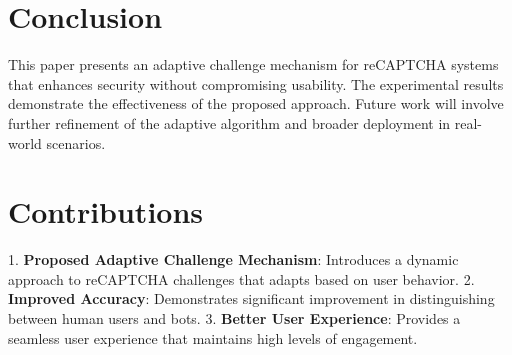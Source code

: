 \documentclass{article}
\begin{document}
\section{Conclusion}
This paper presents an adaptive challenge mechanism for reCAPTCHA systems that enhances security without compromising usability. The experimental results demonstrate the effectiveness of the proposed approach. Future work will involve further refinement of the adaptive algorithm and broader deployment in real-world scenarios.

\section{Contributions}
1. \textbf{Proposed Adaptive Challenge Mechanism}: Introduces a dynamic approach to reCAPTCHA challenges that adapts based on user behavior.
2. \textbf{Improved Accuracy}: Demonstrates significant improvement in distinguishing between human users and bots.
3. \textbf{Better User Experience}: Provides a seamless user experience that maintains high levels of engagement.
\end{document}
